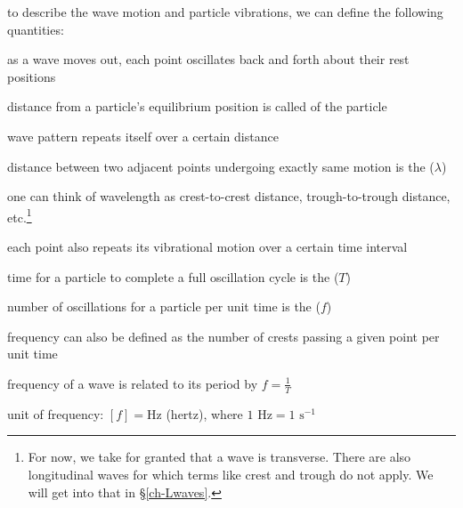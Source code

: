 to describe the wave motion and particle vibrations, we can define the following quantities:


\cmt as a wave moves out, each point oscillates back and forth about their rest positions

distance from a particle's equilibrium position is called  of the particle 

\cmt wave pattern repeats itself over a certain distance

distance between two adjacent points undergoing exactly same motion is the  ($\lambda$)

one can think of wavelength as crest-to-crest distance, trough-to-trough distance, etc.\footnote{For now, we take for granted that a wave is transverse. There are also longitudinal waves for which terms like crest and trough do not apply. We will get into that in \S\ref{ch-Lwaves}.}

\cmt each point also repeats its vibrational motion over a certain time interval

time for a particle to complete a full oscillation cycle is the   ($T$)

\cmt number of oscillations for a particle per unit time is the  ($f$)

frequency can also be defined as the number of crests passing a given point per unit time

frequency of a wave is related to its period by $\boxed{f=\frac{1}{T}}$

unit of frequency: $[f] = \text{Hz}$ (hertz), where $1 \text{ Hz} = 1 \text{ s}^{-1}$

